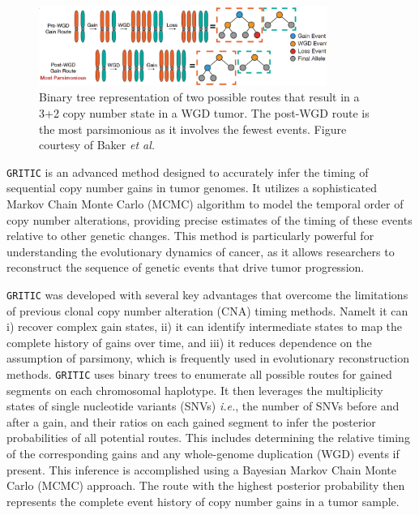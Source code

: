 \begin{figure} %
  \centering
  \begin{mdframed}
  \includegraphics[width=3.7in]{./Figures/binary_tree.png}
  \caption{Binary tree representation of two possible routes that result in a 3+2 copy number state in a WGD tumor. 
  The post-WGD route is the most parsimonious as it involves the fewest events.
  Figure courtesy of Baker \textit{et al.}}
  \label{binary_tree}
  \end{mdframed}
\end{figure}

\vspace{1em}
\noindent
\texttt{GRITIC} is an advanced method designed to accurately infer the timing of sequential copy number gains in tumor genomes. 
It utilizes a sophisticated Markov Chain Monte Carlo (MCMC) algorithm to model the temporal order of copy number alterations, 
providing precise estimates of the timing of these events relative to other genetic changes. 
This method is particularly powerful for understanding the evolutionary dynamics of cancer, 
as it allows researchers to reconstruct the sequence of genetic events that drive tumor progression.

\vspace{1em}
\noindent
\texttt{GRITIC} was developed with several key advantages that overcome the limitations of previous clonal copy number alteration (CNA) timing methods. 
Namelt it can i) recover complex gain states, 
ii) it can identify intermediate states to map the complete history of gains over time, and 
iii) it reduces dependence on the assumption of parsimony, which is frequently used in evolutionary reconstruction methods.
\texttt{GRITIC} uses binary trees to enumerate all possible routes for gained segments on each chromosomal haplotype. 
It then leverages the multiplicity states of single nucleotide variants (SNVs) \textit{i.e.}, the number of SNVs before and after a gain,
and their ratios on each gained segment to infer the posterior probabilities of all potential routes. 
This includes determining the relative timing of the corresponding gains and any whole-genome duplication (WGD) events if present. 
This inference is accomplished using a Bayesian Markov Chain Monte Carlo (MCMC) approach. 
The route with the highest posterior probability then represents the complete event history of copy number gains in a tumor sample.

